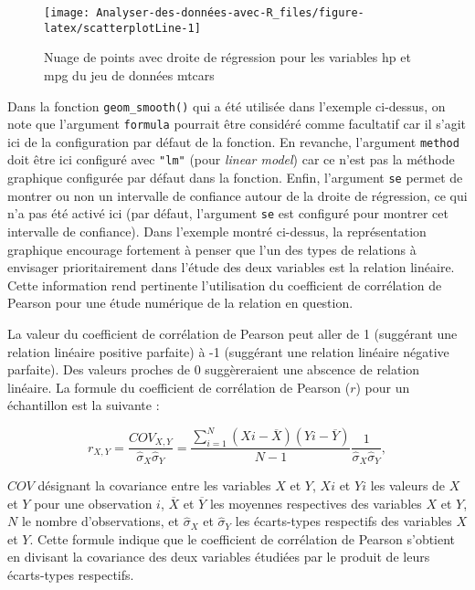 \documentclass[
  french,
]{book}
\begin{document}
\begin{figure}

{\centering \texttt{[image: Analyser-des-données-avec-R\_files/figure-latex/scatterplotLine-1]} 

}

\caption{Nuage de points avec droite de régression pour les variables hp et mpg du jeu de données mtcars}\label{fig:scatterplotLine}
\end{figure}

Dans la fonction \texttt{geom\_smooth()} qui a été utilisée dans l'exemple ci-dessus, on note que l'argument \texttt{formula} pourrait être considéré comme facultatif car il s'agit ici de la configuration par défaut de la fonction. En revanche, l'argument \texttt{method} doit être ici configuré avec \texttt{"lm"} (pour \emph{linear model}) car ce n'est pas la méthode graphique configurée par défaut dans la fonction. Enfin, l'argument \texttt{se} permet de montrer ou non un intervalle de confiance autour de la droite de régression, ce qui n'a pas été activé ici (par défaut, l'argument \texttt{se} est configuré pour montrer cet intervalle de confiance). Dans l'exemple montré ci-dessus, la représentation graphique encourage fortement à penser que l'un des types de relations à envisager prioritairement dans l'étude des deux variables est la relation linéaire. Cette information rend pertinente l'utilisation du coefficient de corrélation de Pearson pour une étude numérique de la relation en question.

La valeur du coefficient de corrélation de Pearson peut aller de 1 (suggérant une relation linéaire positive parfaite) à -1 (suggérant une relation linéaire négative parfaite). Des valeurs proches de 0 suggèreraient une abscence de relation linéaire. La formule du coefficient de corrélation de Pearson (\(r\)) pour un échantillon est la suivante :

\[r_{X,Y} =  {\frac{COV_{X,Y}}{\hat{\sigma}_{X} \hat{\sigma}_{Y}}} =  {\frac{\sum_{i=1}^{N} (X{i} - \overline{X}) (Y{i} - \overline{Y})}{N-1}} {\frac{1}{\hat{\sigma}_{X} \hat{\sigma}_{Y}}},\]

\(COV\) désignant la covariance entre les variables \(X\) et \(Y\), \(X{i}\) et \(Y{i}\) les valeurs de \(X\) et \(Y\) pour une observation \(i\), \(\overline{X}\) et \(\overline{Y}\) les moyennes respectives des variables \(X\) et \(Y\), \(N\) le nombre d'observations, et \(\hat{\sigma}_{X}\) et \(\hat{\sigma}_{Y}\) les écarts-types respectifs des variables \(X\) et \(Y\). Cette formule indique que le coefficient de corrélation de Pearson s'obtient en divisant la covariance des deux variables étudiées par le produit de leurs écarts-types respectifs.
\end{document}
